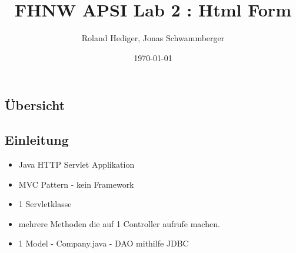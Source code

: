 \documentclass{beamer}
\begin{document}
\title{FHNW APSI Lab 2 : Html Form}   
\author{Roland Hediger, Jonas Schwammberger} 

\date{\today} 

\frame{\titlepage} 

\begin{frame}
\section*{Übersicht}
\tableofcontents
\end{frame} 

\begin{frame}
 \section{Einleitung}
 \begin{itemize}
  \item Java HTTP Servlet Applikation
  \item MVC Pattern - kein Framework 
  \item 1 Servletklasse 
  \item mehrere Methoden die auf 1 Controller aufrufe machen.
  \item 1 Model - Company.java - DAO mithilfe JDBC
 \end{itemize}
\end{frame}
\end{document}
